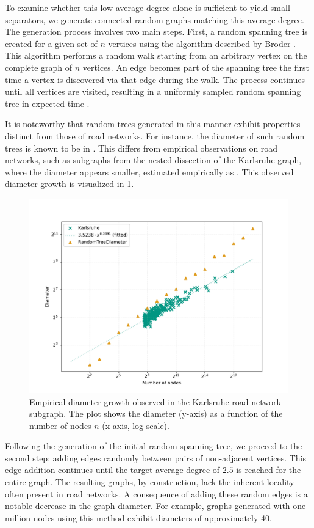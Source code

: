 To examine whether this low average degree alone is sufficient to yield small separators, we generate connected random graphs matching this average degree.
The generation process involves two main steps.
First, a random spanning tree is created for a given set of \(n\) vertices using the algorithm described by Broder \cite{broder_generating_1989}.
This algorithm performs a random walk starting from an arbitrary vertex on the complete graph of \(n\) vertices.
An edge becomes part of the spanning tree the first time a vertex is discovered via that edge during the walk.
The process continues until all vertices are visited, resulting in a uniformly sampled random spanning tree in expected time .

It is noteworthy that random trees generated in this manner exhibit properties distinct from those of road networks.
For instance, the diameter of such random trees is known to be in  \cite{chlamtac_tree-based_1987}.
This differs from empirical observations on road networks, such as subgraphs from the nested dissection of the Karlsruhe graph, where the diameter appears smaller, estimated empirically as .
This observed diameter growth is visualized in \cref{fig:diameter_karlsruhe}.

\begin{figure}[tbhp]
    \centering
    \includegraphics[width=0.6\linewidth]{graphics/diameters.pdf}
    \caption{Empirical diameter growth observed in the Karlsruhe road network subgraph. The plot shows the diameter (y-axis) as a function of the number of nodes \(n\) (x-axis, log scale).}
    \label{fig:diameter_karlsruhe}
\end{figure}

Following the generation of the initial random spanning tree, we proceed to the second step: adding edges randomly between pairs of non-adjacent vertices.
This edge addition continues until the target average degree of \(2.5\) is reached for the entire graph.
The resulting graphs, by construction, lack the inherent locality often present in road networks.
A consequence of adding these random edges is a notable decrease in the graph diameter.
For example, graphs generated with one million nodes using this method exhibit diameters of approximately 40.

